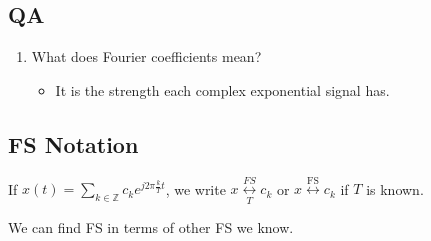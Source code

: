 \subsection{QA}
\begin{definition}
    \begin{enumerate}
        \item What does Fourier coefficients mean?
        \begin{itemize}
            \item It is the strength each complex exponential signal has. 
        \end{itemize}
    \end{enumerate}
\end{definition}

\subsection{FS Notation}
\begin{definition}
    If \( x(t) = \sum_{k \in \mathbb{Z}} c_k e^{j 2\pi \frac{k}{T} t} \), we write \( x \underset{T}{\overset{FS}{\longleftrightarrow}} c_k \) or \( x \overset{\text{FS}}{\longleftrightarrow} c_k \) if \( T \) is known.
\end{definition}

\begin{warning}
    We can find FS in terms of other FS we know. 
\end{warning}

